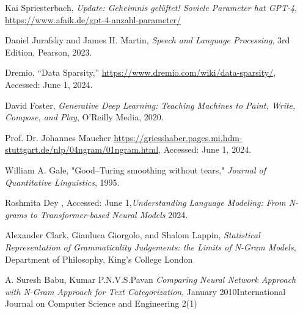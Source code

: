 \documentclass[12pt]{article}
\begin{document}
\clearpage
\begin{thebibliography}{9}

	Kai Spriesterbach, \textit{Update: Geheimnis gelüftet! Soviele Parameter hat GPT-4}, \url{https://www.afaik.de/gpt-4-anzahl-parameter/}

	Daniel Jurafsky and James H. Martin, \textit{Speech and Language Processing}, 3rd Edition, Pearson, 2023.

	Dremio, ``Data Sparsity,'' \url{https://www.dremio.com/wiki/data-sparsity/}, Accessed: June 1, 2024.

	David Foster, \textit{Generative Deep Learning: Teaching Machines to Paint, Write, Compose, and Play}, O'Reilly Media, 2020.

	Prof. Dr. Johannes Maucher \url{https://griesshaber.pages.mi.hdm-stuttgart.de/nlp/04ngram/01ngram.html}, Accessed: June 1, 2024.

	William A. Gale, "Good–Turing smoothing without tears," \textit{Journal of Quantitative Linguistics}, 1995.

	Roshmita Dey , Accessed: June 1,\textit{Understanding Language Modeling: From N-grams to Transformer-based Neural Models} 2024.

	Alexander Clark, Gianluca Giorgolo, and Shalom Lappin, \textit{Statistical Representation of Grammaticality Judgements: the Limits of
		N-Gram Models}, Department of Philosophy, King’s College London

	A. Suresh Babu, Kumar P.N.V.S.Pavan
	\textit{Comparing Neural Network Approach with N-Gram Approach for Text Categorization},     January 2010International Journal on Computer Science and Engineering 2(1)

\end{thebibliography}
\end{document}
